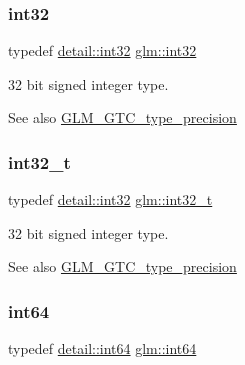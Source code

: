 \subsubsection{\texorpdfstring{int32}{int32}}
{\footnotesize\ttfamily typedef \hyperlink{namespaceglm_1_1detail_a9f85b4efeca416cdcec2fd08939a2e17}{detail\+::int32} \hyperlink{group__gtc__type__precision_ga632d8b25f6b61659f39ea4321fab92a4}{glm\+::int32}}

32 bit signed integer type. \begin{DoxySeeAlso}{See also}
\hyperlink{group__gtc__type__precision}{G\+L\+M\+\_\+\+G\+T\+C\+\_\+type\+\_\+precision} 
\end{DoxySeeAlso}
\mbox{\label{group__gtc__type__precision_gab870c0eb6f525b0c8c4716762e0fc3a8}} 
\subsubsection{\texorpdfstring{int32\+\_\+t}{int32\_t}}
{\footnotesize\ttfamily typedef \hyperlink{namespaceglm_1_1detail_a9f85b4efeca416cdcec2fd08939a2e17}{detail\+::int32} \hyperlink{group__gtc__type__precision_gab870c0eb6f525b0c8c4716762e0fc3a8}{glm\+::int32\+\_\+t}}

32 bit signed integer type. \begin{DoxySeeAlso}{See also}
\hyperlink{group__gtc__type__precision}{G\+L\+M\+\_\+\+G\+T\+C\+\_\+type\+\_\+precision} 
\end{DoxySeeAlso}
\mbox{\label{group__gtc__type__precision_ga435d75819cce297cc5fa21bd84ef89a5}} 
\subsubsection{\texorpdfstring{int64}{int64}}
{\footnotesize\ttfamily typedef \hyperlink{namespaceglm_1_1detail_a5b1c3227ec636c24a0676746381adfc8}{detail\+::int64} \hyperlink{group__gtc__type__precision_ga435d75819cce297cc5fa21bd84ef89a5}{glm\+::int64}}

